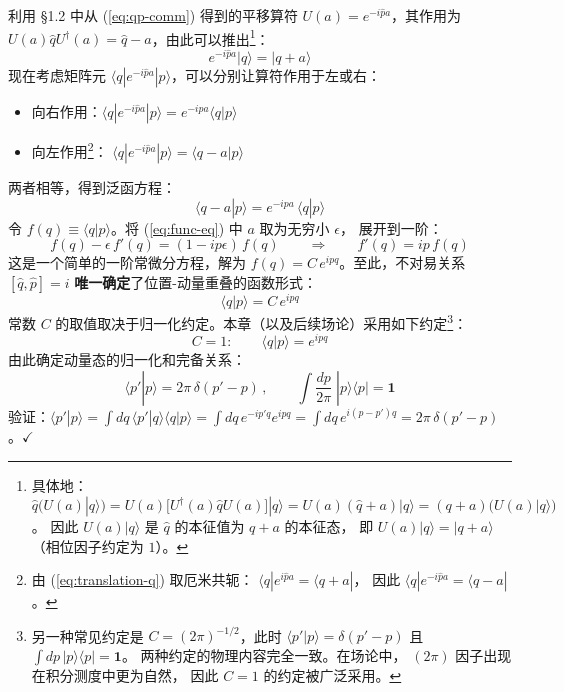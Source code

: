 利用 \S1.2 中从 (\ref{eq:qp-comm}) 得到的平移算符 $U(a) = e^{-i\hat{p}a}$，其作用为
$U(a)\hat{q}U^\dagger(a) = \hat{q} - a$，由此可以推出\footnote{
具体地：$\hat{q}\bigl(U(a)|q\rangle\bigr)
= U(a)\bigl[U^\dagger(a)\hat{q}U(a)\bigr]|q\rangle
= U(a)(\hat{q}+a)|q\rangle
= (q+a)\bigl(U(a)|q\rangle\bigr)$。
因此 $U(a)|q\rangle$ 是 $\hat{q}$ 的本征值为 $q+a$ 的本征态，
即 $U(a)|q\rangle = |q+a\rangle$（相位因子约定为 $1$）。}：
\begin{equation}\label{eq:translation-q}
  e^{-i\hat{p}a}|q\rangle = |q+a\rangle
\end{equation}
现在考虑矩阵元 $\langle q|e^{-i\hat{p}a}|p\rangle$，可以分别让算符作用于左或右：
\begin{itemize}
  \item 向右作用：$\langle q|e^{-i\hat{p}a}|p\rangle = e^{-ipa}\langle q|p\rangle$
  \item 向左作用\footnote{由 (\ref{eq:translation-q}) 取厄米共轭：
        $\langle q|e^{i\hat{p}a} = \langle q+a|$，
        因此 $\langle q|e^{-i\hat{p}a} = \langle q-a|$。}：
        $\langle q|e^{-i\hat{p}a}|p\rangle = \langle q-a|p\rangle$
\end{itemize}
两者相等，得到泛函方程：
\begin{equation}\label{eq:func-eq}
  \langle q-a|p\rangle = e^{-ipa}\,\langle q|p\rangle
\end{equation}
令 $f(q) \equiv \langle q|p\rangle$。将 (\ref{eq:func-eq}) 中 $a$ 取为无穷小 $\epsilon$，
展开到一阶：
\[
  f(q) - \epsilon\,f'(q) = (1 - ip\epsilon)\,f(q)
  \qquad\Longrightarrow\qquad
  f'(q) = ip\,f(q)
\]
这是一个简单的一阶常微分方程，解为 $f(q) = C\,e^{ipq}$。至此，不对易关系 $[\hat{q},\hat{p}] = i$
\textbf{唯一确定}了位置-动量重叠的函数形式：
\begin{equation}\label{eq:qp-overlap}
\boxed{
  \langle q|p\rangle = C\,e^{ipq}
}
\end{equation}
常数 $C$ 的取值取决于归一化约定。本章（以及后续场论）采用如下约定\footnote{
另一种常见约定是 $C = (2\pi)^{-1/2}$，此时
$\langle p'|p\rangle = \delta(p'-p)$ 且 $\int dp\,|p\rangle\langle p| = \mathbf{1}$。
两种约定的物理内容完全一致。在场论中，
$(2\pi)$ 因子出现在积分测度中更为自然，
因此 $C = 1$ 的约定被广泛采用。}：
\begin{equation}\label{eq:convention}
  C = 1 :\qquad
  \langle q|p\rangle = e^{ipq}
\end{equation}
由此确定动量态的归一化和完备关系：
\begin{equation}\label{eq:p-complete}
  \langle p'|p\rangle = 2\pi\,\delta(p'-p)\,,\qquad
  \int\frac{dp}{2\pi}\;|p\rangle\langle p| = \mathbf{1}
\end{equation}
验证：$\langle p'|p\rangle = \int dq\,\langle p'|q\rangle\langle q|p\rangle
= \int dq\,e^{-ip'q}e^{ipq}
= \int dq\,e^{i(p-p')q} = 2\pi\,\delta(p'-p)$。$\checkmark$


